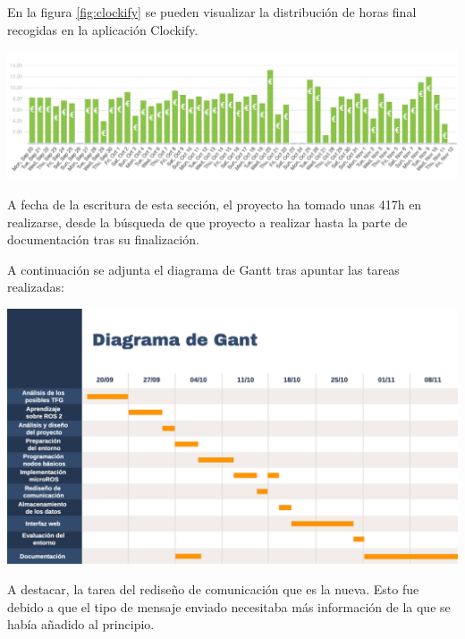 En la figura \ref{fig:clockify} se pueden visualizar la distribución de horas final recogidas en la aplicación Clockify.

\begin{center}
    \centering
    \includegraphics[width=\textwidth]{img/04-diagrama-horas.png}
    \label{fig:clockify}
\end{center}

A fecha de la escritura de esta sección, el proyecto ha tomado unas 417h en realizarse, desde la búsqueda de que proyecto a realizar hasta la parte de documentación tras su finalización.

A continuación se adjunta el diagrama de Gantt tras apuntar las tareas realizadas:

\newpage

\begin{center}
    \centering
    \includegraphics[width=\textwidth]{img/04-Diagrama-Gantt.png}
    \label{fig:gantt}
\end{center}

A destacar, la tarea del rediseño de comunicación que es la nueva. Esto fue debido a que el tipo de mensaje enviado necesitaba más información de la que se había añadido al principio.